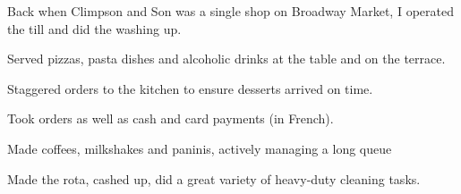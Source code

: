 \documentclass[a4paper,nomath]{deedy-resume} %
\begin{document}
\begin{minipage}[t]{0.66\textwidth}
\begin{tightitemize}
    \end{tightitemize}
    
    \sectionspace %


    \vspace{\topsep} %
    \begin{tightitemize}
    	\item Back when Climpson and Son was a single shop on Broadway Market, I operated the till and did the washing up.
    	
    \end{tightitemize}
    
    \sectionspace %

	
	\vspace{\topsep} %
	\begin{tightitemize}
	\item Served pizzas, pasta dishes and alcoholic drinks at the table and on the terrace.
	\item Staggered orders to the kitchen to ensure desserts arrived on time.
	\item Took orders as well as cash and card payments (in French).
	
	\end{tightitemize}
	
	\sectionspace %
	

    \vspace{\topsep} %
    \begin{tightitemize}
    	\item Made coffees, milkshakes and paninis, actively managing a long queue
		\item Made the rota, cashed up, did a great variety of heavy-duty cleaning tasks.
    	
    \end{tightitemize}
    

\end{minipage}
\end{document}
